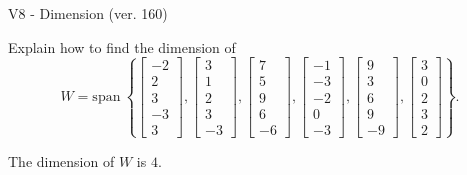 \begin{exercise}
  \begin{exerciseTitle}V8 - Dimension (ver. 160)\end{exerciseTitle}
  \begin{exerciseStatement}
    Explain how to find the dimension of 
\[W=\mathrm{span}\ \left\{\left[\begin{array}{r}
-2 \\
2 \\
3 \\
-3 \\
3
\end{array}\right] , \left[\begin{array}{r}
3 \\
1 \\
2 \\
3 \\
-3
\end{array}\right] , \left[\begin{array}{r}
7 \\
5 \\
9 \\
6 \\
-6
\end{array}\right] , \left[\begin{array}{r}
-1 \\
-3 \\
-2 \\
0 \\
-3
\end{array}\right] , \left[\begin{array}{r}
9 \\
3 \\
6 \\
9 \\
-9
\end{array}\right] , \left[\begin{array}{r}
3 \\
0 \\
2 \\
3 \\
2
\end{array}\right]\right\}.\]



  \end{exerciseStatement}
  \begin{exerciseAnswer}
   The dimension of \(W\) is  \(4\).
  


  \end{exerciseAnswer}
\end{exercise}